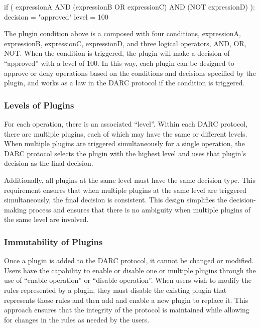 \documentclass[main.tex]{subfiles}
\begin{document}
\begin{spverbatim}

if ( 
    expressionA AND
    (expressionB OR expressionC) AND
    (NOT expressionD)
   ):
    decision = "approved"
    level = 100

\end{spverbatim}

The plugin condition above is a composed with four conditions, expressionA, expressionB, expressionC, expressionD, and three logical operators, AND, OR, NOT. When the condition is triggered, the plugin will make a decision of ``approved'' with a level of 100. In this way, each plugin can be designed to approve or deny operations based on the conditions and decisions specified by the plugin, and works as a law in the DARC protocol if the condition is triggered.

\subsubsection{Levels of Plugins}

For each operation, there is an associated ``level''. Within each DARC protocol, there are multiple plugins, each of which may have the same or different levels. When multiple plugins are triggered simultaneously for a single operation, the DARC protocol selects the plugin with the highest level and uses that plugin's decision as the final decision.

Additionally, all plugins at the same level must have the same decision type. This requirement ensures that when multiple plugins at the same level are triggered simultaneously, the final decision is consistent. This design simplifies the decision-making process and ensures that there is no ambiguity when multiple plugins of the same level are involved.

\subsubsection{Immutability of Plugins}

Once a plugin is added to the DARC protocol, it cannot be changed or modified. Users have the capability to enable or disable one or multiple plugins through the use of ``enable operation'' or ``disable operation''.  When users wish to modify the rules represented by a plugin, they must disable the existing plugin that represents those rules and then add and enable a new plugin to replace it. This approach ensures that the integrity of the protocol is maintained while allowing for changes in the rules as needed by the users.
\end{document}
